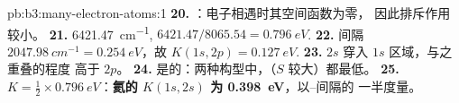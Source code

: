 \begin{solution}{pb:b3:many-electron-atoms:1}
\textbf{20.} ：电子相遇时其空间函数为零，
因此排斥作用较小。
\textbf{21.} \qty{6421.47}{cm^{-1}}, $6421.47/8065.54 = \qty{0.796}{eV}$.
\textbf{22.} 间隔 $\qty{2047.98}{cm^{-1}} = \qty{0.254}{eV}$，故 $K(1s,2p) =
\qty{0.127}{eV}$.
\textbf{23.} $2s$ 穿入 $1s$ 区域，与之重叠的程度
高于 $2p$。
\textbf{24.} 是的：两种构型中，（$S$ 较大）都最低。
\textbf{25.} $K = \frac12 \times \qty{0.796}{eV}$：\textbf{氦的 $K(1s,2s)$ 为 \qty{0.398}{eV}}，以–间隔的
一半度量。
\end{solution}
